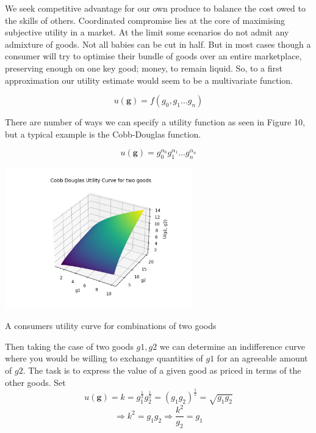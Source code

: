 \documentclass{tufte-handout}
\begin{document}
\noindent We seek competitive advantage for our own produce to balance the cost owed to the skills of others. Coordinated compromise lies at the core of maximising subjective utility in a market. At the limit some scenarios do not admit any admixture of goods. Not all babies can be cut in half. But in most cases though a consumer will try to optimise their bundle of goods over an entire marketplace, preserving enough on one key good; money, to remain liquid. So, to a first approximation our utility estimate would seem to be a multivariate function. 

$$ u(\mathbf{g}) = f(g_{0}, g_{1} ... g_{n}) $$

\noindent There are number of ways we can specify a utility function as seen in Figure 10, but a typical example is the Cobb-Douglas function. 

$$ u(\mathbf{g}) = g_{0}^{\alpha_{0}}g_{1}^{\alpha_{1}} ... g_{n}^{\alpha_{n}}$$

\begin{marginfigure}
\includegraphics[width=3.2in, height=5.in]{Plots/cobb_douglas_utility.png}
\caption{A consumers utility curve for combinations of two goods}
\end{marginfigure} 

\noindent Then taking the case of two goods $g1, g2$ we can determine an indifference curve where you would be willing to exchange quantities of $g1$ for an agreeable amount of $g2$. The task is to express the value of a given good as priced in terms of the other goods. Set 
$$u(\mathbf{g}) = k =  g_{1}^{\frac{1}{2}}g_{2}^{\frac{1}{2}} = (g_{1}g_{2})^{\frac{1}{2}}  = \sqrt{g_{1}g_{2}}$$
$$ \Rightarrow k^{2} = g_{1}g_{2} \Rightarrow \frac{k^{2}}{g_{2}} = g_{1}$$
\end{document}
